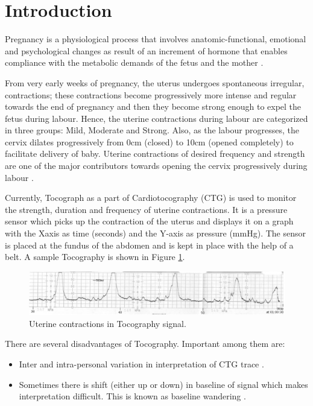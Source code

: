 \documentclass[bioengineering,article,submit,moreauthors,pdftex,10pt,a4paper]{mdpi}
\begin{document}
\section{Introduction}

Pregnancy is a physiological process that involves
anatomic-functional, emotional and psychological changes as
result of an increment of hormone that enables compliance
with the metabolic demands of the fetus and the mother \cite{ref-weisswolfe}.

From very early weeks of pregnancy, the uterus undergoes
spontaneous irregular, contractions; these contractions become
progressively more intense and regular towards the end of
pregnancy and then they become strong enough to expel the
fetus during labour. Hence, the uterine contractions during
labour are categorized in three groups: Mild, Moderate and
Strong. Also, as the labour progresses, the cervix dilates
progressively from 0cm (closed) to 10cm (opened completely)
to facilitate delivery of baby. Uterine contractions of desired
frequency and strength are one of the major contributors
towards opening the cervix progressively during labour \cite{ref-hatfield}.


Currently, Tocograph as a part of Cardiotocography (CTG) is
used to monitor the strength, duration and frequency of uterine
contractions. It is a pressure sensor which picks up the
contraction of the uterus and displays it on a graph with the Xaxis as time (seconds) and the Y-axis as pressure (mmHg).
The sensor is placed at the fundus of the abdomen and is kept
in place with the help of a belt. A sample Tocography is
shown in Figure \ref{toco}.

 \begin{figure}[H]
 	\caption{\label{toco} Uterine contractions in Tocography signal.}
 	\begin{center}
 		\includegraphics[scale=0.45]{imagens/toco.jpg} 		
 	\end{center}
 \end{figure}
 
 There are several disadvantages of Tocography. Important
 among them are:
 
 \begin{itemize}[leftmargin=*,labelsep=5.8mm]
 	\item	Inter and intra-personal variation in interpretation of CTG
 	trace \cite{ref-bernardes}.
 	\item	Sometimes there is shift (either up or down) in baseline of
 	signal which makes interpretation difficult. This is known as
 	baseline wandering \cite{ref-marques}. 	
 \end{itemize}
 
\end{document}
